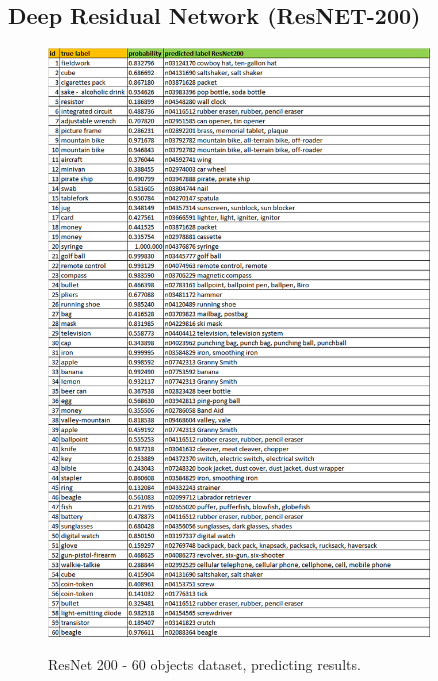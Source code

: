 \documentclass[12pt]{article}
\numberwithin{equation}{section}
\numberwithin{table}{section}
\numberwithin{figure}{section}
\begin{document}
\subsection{Deep Residual Network (ResNET-200)}
\begin{figure}[H] \centering
	\caption{ResNet 200 - 60 objects dataset, predicting results.}
	\includegraphics[width=0.9\textwidth]{resnet200.png}
	\label{r3}
\end{figure}

\end{document}
